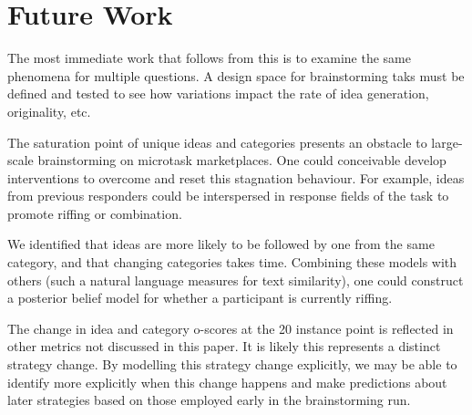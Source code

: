 \section{Future Work}

The most immediate work that follows from this is to examine the same phenomena for multiple questions. A design space for brainstorming taks must be defined and tested to see how variations impact the rate of idea generation, originality, etc.

The saturation point of unique ideas and categories presents an obstacle to large-scale brainstorming on microtask marketplaces. One could conceivable develop interventions to overcome and reset this stagnation behaviour. For example, ideas from previous responders could be interspersed in response fields of the task to promote riffing or combination.

We identified that ideas are more likely to be followed by one from the same category, and that changing categories takes time. Combining these models with others (such a natural language measures for text similarity), one could construct a posterior belief model for whether a participant is currently riffing.

The change in idea and category o-scores at the 20 instance point is reflected in other metrics not discussed in this paper. It is likely this represents a distinct strategy change. By modelling this strategy change explicitly, we may be able to identify more explicitly when this change happens and make predictions about later strategies based on those employed early in the brainstorming run.


